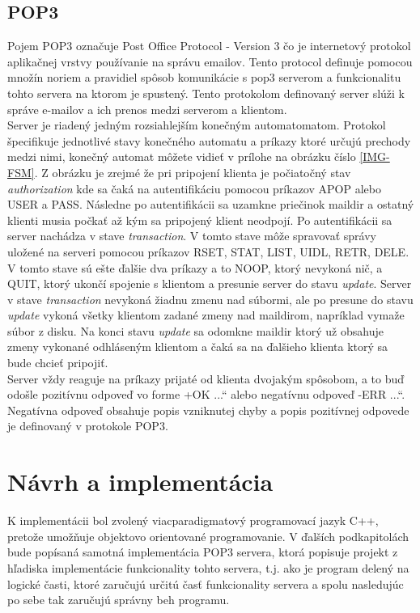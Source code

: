 \documentclass[11pt,a4paper]{article}
\providecommand{\uv}[1]{\quotedblbase #1\textquotedblleft}
\begin{document}
	\subsection{POP3}
		\label{fig:pop3}
		\indent Pojem POP3 označuje Post Office Protocol - Version 3\cite{POP3} čo je internetový protokol aplikačnej vrstvy používanie na správu emailov. Tento protocol definuje pomocou množín noriem a pravidiel spôsob komunikácie s pop3 serverom a funkcionalitu tohto servera na ktorom je spustený. Tento protokolom definovaný server slúži k správe e-mailov a ich prenos medzi serverom a klientom.\\[0.4em]
		Server je riadený jedným rozsiahlejším konečným automatomatom. Protokol špecifikuje jednotlivé stavy konečného automatu a príkazy ktoré určujú prechody medzi nimi, konečný automat môžete vidieť v prílohe na obrázku číslo \ref{IMG-FSM}. Z obrázku je zrejmé že pri pripojení klienta je počiatočný stav \textit{authorization} kde sa čaká na autentifikáciu pomocou príkazov APOP alebo USER a PASS. Následne po autentifikácii sa uzamkne priečinok maildir a ostatný klienti musia počkať až kým sa pripojený klient neodpojí. Po autentifikácii sa server nachádza v stave \textit{transaction}. V tomto stave môže spravovať správy uložené na serveri pomocou príkazov RSET, STAT, LIST, UIDL, RETR, DELE. V tomto stave sú ešte ďalšie dva príkazy a to NOOP, ktorý nevykoná nič, a QUIT, ktorý ukončí spojenie s klientom a presunie server do stavu \textit{update}. Server v stave \textit{transaction} nevykoná žiadnu zmenu nad súbormi, ale po presune do stavu \textit{update} vykoná všetky klientom zadané zmeny nad maildirom, napríklad vymaže súbor z disku. Na konci stavu \textit{update} sa odomkne maildir ktorý už obsahuje zmeny vykonané odhláseným klientom a čaká sa na ďalšieho klienta ktorý sa bude chcieť pripojiť.\\[0.4em]
		Server vždy reaguje na príkazy prijaté od klienta dvojakým spôsobom, a to buď odošle pozitívnu odpoveď vo forme \uv{+OK ...} alebo negatívnu odpoveď \uv{-ERR ...}. Negatívna odpoveď obsahuje popis vzniknutej chyby a popis pozitívnej odpovede je definovaný v protokole POP3\cite{POP3}.


\section{Návrh a implementácia}

	\indent K implementácii bol zvolený viacparadigmatový programovací jazyk C++, pretože umožňuje objektovo orientované programovanie. V ďalších podkapitolách bude popísaná samotná implementácia POP3 servera, ktorá popisuje projekt z hľadiska implementácie funkcionality tohto servera, t.j. ako je program delený na logické časti, ktoré zaručujú určitú časť funkcionality servera a spolu nasledujúc po sebe tak zaručujú správny beh programu.
\end{document}
